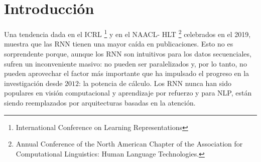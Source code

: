 \documentclass[conference]{IEEEtran}
\begin{document}
\begin{abstract}
El modelado del lenguaje se ha abordado recientemente utilizando m\'etodos de entrenamiento no supervisados como ELMo y BERT. Sin embargo, sigue siendo un desaf\'io equipar adecuadamente las redes neuronales con una dependencia a largo plazo. 

En efecto, pese a que los modelos secuencia a secuencia son bastante vers\'atiles y se utilizan en una variedad de tareas de NLP, una desventaja cr\'itica es el dise\~no vectorial del contexto de longitud fija que no puede recordar oraciones largas. Un enfoque para resolver el problema de la p\'erdida de informaci\'on relevante en oraciones largas es utilizar el mecanismo de atenci\'on que necesita calcular un valor para cada combinaci\'on de palabras de entrada y salida, por lo que suele ser costoso.  En  arquitecturas que utilizan el modelo Transformer, se utiliza variantes del mecanismo de atenci\'on  para aprender tambi\'en las dependencias de entrada y salida y pese al potencial de este algoritmo, tienen el problema de no extenderse m\'as all\'a de un cierto nivel debido al uso del contexto de longitud fija no puede modelar dependencias que son m\'as largas que una longitud fija.

Para resolver estos problemas se plantea un nuevo modelo llamado Transformer-XL, que forma parte  de un nuevo conjunto de t\'ecnicas utilizadas para entrenar modelos altamente eficientes y de alto rendimiento en NLP. 

En este trabajo se implementan sobre conjuntos reducidos como Penn Treebank varias de las t\'ecnicas recientes como el Transformer- XL, XLNet, que son una variante del  Transformer.

\vspace{0.2cm}


\'Indice de T\'erminos— RNN, modelos seq2seq, mecanismos de atenci\'on, transformers,  Hugging Face.
    
\end{abstract}

\section{Introducci\'on}
Una tendencia dada en el ICRL \footnote{International Conference on Learning Representations } y en el NAACL- HLT \footnote{Annual Conference of the North American Chapter of the Association for Computational Linguistics: Human Language Technologies.} celebrados en el 2019,  muestra que las  RNN tienen una mayor ca\'ida en publicaciones. Esto no es sorprendente porque, aunque los RNN son intuitivos para los datos secuenciales, sufren un inconveniente masivo: no pueden ser paralelizados y, por lo tanto, no pueden aprovechar el factor m\'as importante que ha impulsado el progreso en la investigaci\'on desde $2012$: la potencia de c\'alculo. Los RNN nunca han sido populares en visi\'on computacional y aprendizaje por refuerzo y para NLP, est\'an siendo reemplazados por arquitecturas basadas en la atenci\'on.
\end{document}
